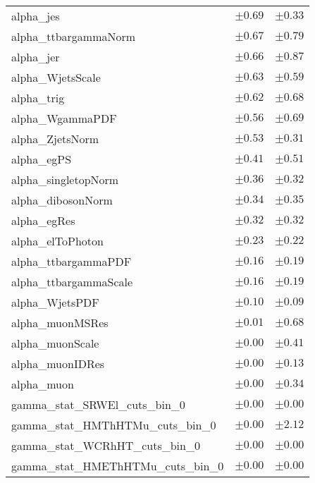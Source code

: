 \begin{table}
\begin{center}
\begin{tabular*}{\textwidth}{@{\extracolsep{\fill}}lcc}
alpha\_jes         & $\pm 0.69$          & $\pm 0.33$       \\
alpha\_ttbargammaNorm         & $\pm 0.67$          & $\pm 0.79$       \\
alpha\_jer         & $\pm 0.66$          & $\pm 0.87$       \\
alpha\_WjetsScale         & $\pm 0.63$          & $\pm 0.59$       \\
alpha\_trig         & $\pm 0.62$          & $\pm 0.68$       \\
alpha\_WgammaPDF         & $\pm 0.56$          & $\pm 0.69$       \\
alpha\_ZjetsNorm         & $\pm 0.53$          & $\pm 0.31$       \\
alpha\_egPS         & $\pm 0.41$          & $\pm 0.51$       \\
alpha\_singletopNorm         & $\pm 0.36$          & $\pm 0.32$       \\
alpha\_dibosonNorm         & $\pm 0.34$          & $\pm 0.35$       \\
alpha\_egRes         & $\pm 0.32$          & $\pm 0.32$       \\
alpha\_elToPhoton         & $\pm 0.23$          & $\pm 0.22$       \\
alpha\_ttbargammaPDF         & $\pm 0.16$          & $\pm 0.19$       \\
alpha\_ttbargammaScale         & $\pm 0.16$          & $\pm 0.19$       \\
alpha\_WjetsPDF         & $\pm 0.10$          & $\pm 0.09$       \\
alpha\_muonMSRes         & $\pm 0.01$          & $\pm 0.68$       \\
alpha\_muonScale         & $\pm 0.00$          & $\pm 0.41$       \\
alpha\_muonIDRes         & $\pm 0.00$          & $\pm 0.13$       \\
alpha\_muon         & $\pm 0.00$          & $\pm 0.34$       \\
gamma\_stat\_SRWEl\_cuts\_bin\_0         & $\pm 0.00$          & $\pm 0.00$       \\
gamma\_stat\_HMThHTMu\_cuts\_bin\_0         & $\pm 0.00$          & $\pm 2.12$       \\
gamma\_stat\_WCRhHT\_cuts\_bin\_0         & $\pm 0.00$          & $\pm 0.00$       \\
gamma\_stat\_HMEThHTMu\_cuts\_bin\_0         & $\pm 0.00$          & $\pm 0.00$       \\

\end{tabular*}
\end{center}
\end{table}
